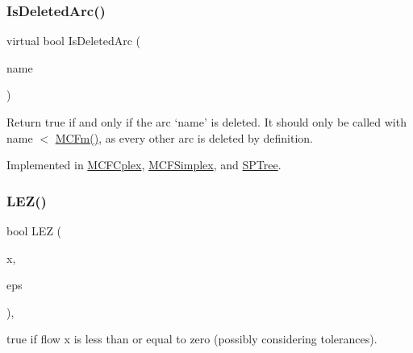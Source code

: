 \mbox{\label{class_m_c_f_class_a5f72b1b728182519a6a11accdfa78c7d}} 
\subsubsection{\texorpdfstring{Is\+Deleted\+Arc()}{IsDeletedArc()}}
{\footnotesize\ttfamily virtual bool Is\+Deleted\+Arc (\begin{DoxyParamCaption}\item[{\mbox{\hyperlink{class_m_c_f_class_a76aaabb20535c51a2752b93f6c38fe54}{c\+Index}}}]{name }\end{DoxyParamCaption})\hspace{0.3cm}{\ttfamily [pure virtual]}}

Return true if and only if the arc `name' is deleted. It should only be called with name $<$ \mbox{\hyperlink{class_m_c_f_class_ab4d5a0d0fc49882de0b4eb3146f1b7a6}{M\+C\+Fm()}}, as every other arc is deleted by definition. 

Implemented in \mbox{\hyperlink{class_m_c_f_cplex_a303cdd3554fa6aa53098d080262d1e4b}{M\+C\+F\+Cplex}}, \mbox{\hyperlink{class_m_c_f_simplex_a303cdd3554fa6aa53098d080262d1e4b}{M\+C\+F\+Simplex}}, and \mbox{\hyperlink{class_s_p_tree_a303cdd3554fa6aa53098d080262d1e4b}{S\+P\+Tree}}.

\mbox{\label{class_m_c_f_class_adc1dfab25fba0d9badd0cce4dc99933b}} 
\subsubsection{\texorpdfstring{L\+E\+Z()}{LEZ()}}
{\footnotesize\ttfamily bool L\+EZ (\begin{DoxyParamCaption}\item[{T}]{x,  }\item[{const T}]{eps }\end{DoxyParamCaption})\hspace{0.3cm}{\ttfamily [inline]}, {\ttfamily [protected]}}

true if flow x is less than or equal to zero (possibly considering tolerances). \mbox{\label{class_m_c_f_class_a34d79a2f00cf8a2416b2b3e41552e843}} 
